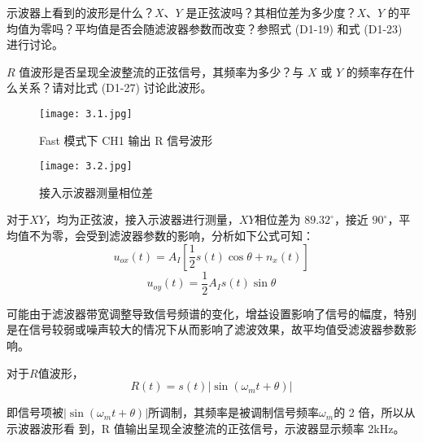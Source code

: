 \documentclass[dvipsnames, svgnames,a4paper,11pt]{article}
\begin{document}
\begin{question}
	示波器上看到的波形是什么？$X$、$Y$ 是正弦波吗？其相位差为多少度？$X$、$Y$ 的平均值为零吗？平均值是否会随滤波器参数而改变？参照式 (D1-19) 和式 (D1-23) 进行讨论。

$R$ 值波形是否呈现全波整流的正弦信号，其频率为多少？与 $X$ 或 $Y$ 的频率存在什么关系？请对比式 (D1-27) 讨论此波形。

\end{question}
\begin{figure}[htbp]
    \centering
    \begin{minipage}{0.45\textwidth}
        \centering
        \texttt{[image: 3.1.jpg]}
        \caption{Fast 模式下 CH1 输出 R 信号波形}
        \label{fig:fast_mode_ch1_r_signal}
    \end{minipage}
    \hfill
    \begin{minipage}{0.45\textwidth}
        \centering
        \texttt{[image: 3.2.jpg]}
        \caption{接入示波器测量相位差}
        \label{fig:phase_difference_measurement}
    \end{minipage}
\end{figure}

	对于$XY$，均为正弦波，接入示波器进行测量，$XY$相位差为 $89.32^\circ$，接近 $90^\circ$，平均值不为零，会受到滤波器参数的影响，分析如下公式可知：
	$$u_{ox}(t)=A_I[\frac12s(t)\cos\theta+n_x(t)]$$
$$u_{oy}(t)=\frac12A_Is(t)\sin\theta$$

可能由于滤波器带宽调整导致信号频谱的变化，增益设置影响了信号的幅度，特别是在信号较弱或噪声较大的情况下从而影响了滤波效果，故平均值受滤波器参数影响。

对于$R$值波形，
$$R\left(t\right)=s(t)\left|\sin\left(\omega_mt+\theta\right)\right|$$

即信号项被$\left|\sin\left(\omega_mt+\theta\right)\right|$所调制，其频率是被调制信号频率$\omega_m$的 2 倍，所以从示波器波形看
到，R 值输出呈现全波整流的正弦信号，示波器显示频率 2kHz。
\end{document}
